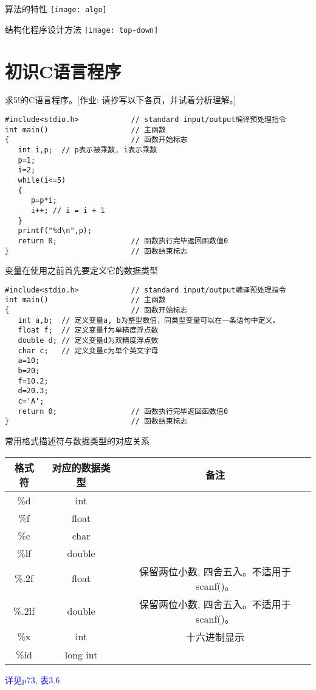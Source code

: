 \begin{frame}{算法的特性}
\texttt{[image: algo]}
\end{frame}

\begin{frame}{结构化程序设计方法}
\texttt{[image: top-down]}
\end{frame}

\section{初识C语言程序}

\begin{frame}[fragile]{求5!的C语言程序。\small{[作业: 请抄写以下各页，并试着分析理解。]}}
\begin{lstlisting}
#include<stdio.h>            // standard input/output编译预处理指令
int main()                   // 主函数
{                            // 函数开始标志
   int i,p;  // p表示被乘数, i表示乘数
   p=1;
   i=2;
   while(i<=5)
   {  
      p=p*i;
      i++; // i = i + 1
   }
   printf("%d\n",p);
   return 0;                 // 函数执行完毕返回函数值0
}                            // 函数结束标志
\end{lstlisting}
\end{frame}

\begin{frame}[fragile]{变量在使用之前首先要定义它的数据类型}
\begin{lstlisting}
#include<stdio.h>            // standard input/output编译预处理指令
int main()                   // 主函数
{                            // 函数开始标志
   int a,b;  // 定义变量a, b为整型数值，同类型变量可以在一条语句中定义。
   float f;  // 定义变量f为单精度浮点数
   double d; // 定义变量d为双精度浮点数
   char c;   // 定义变量c为单个英文字母
   a=10;
   b=20;
   f=10.2;
   d=20.3;
   c='A';
   return 0;                 // 函数执行完毕返回函数值0
}                            // 函数结束标志
\end{lstlisting}
\end{frame}

\begin{frame}{常用格式描述符与数据类型的对应关系}
\begin{tabular}{|c|c|c|}
	\hline 
	\textbf{格式符} & \textbf{对应的数据类型} &  \textbf{备注}\\ 
	\hline 
	\%d & int &  \\ 
	\hline  
	\%f & float &  \\
	\hline
	\%c & char & \\ 
	\hline   
	\%lf & double & \\ 
	\hline 
	\%.2f & float & 保留两位小数, 四舍五入。不适用于scanf()。 \\ 
	\hline 
	\%.2lf & double & 保留两位小数, 四舍五入。不适用于scanf()。 \\ 
	\hline
	\hline   
	\%x & int & 十六进制显示 \\ 
	\hline 
	\%ld & long int &  \\ 
	\hline 
\end{tabular}
\newline
\newline
\textcolor{blue}{详见p73, 表3.6}
\end{frame}

